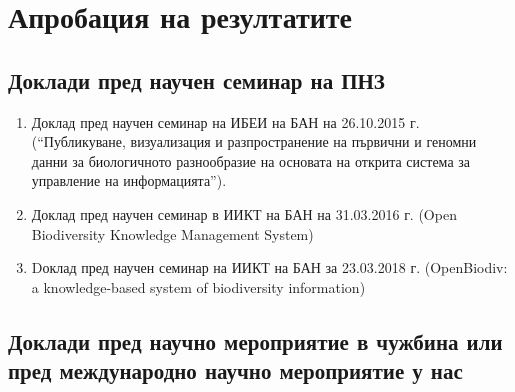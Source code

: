 \section*{Апробация на резултатите}

\subsection*{Доклади пред научен семинар на ПНЗ}

\begin{enumerate}
    \item Доклад пред научен семинар на ИБЕИ на БАН на 26.10.2015 г. (“Публикуване, визуализация и разпространение на първични и геномни данни за биологичното разнообразие на основата на открита система за управление на информацията”).
    \item Доклад пред научен семинар в ИИКТ на БАН на 31.03.2016 г. (Open Biodiversity Knowledge Management System)
    \item Dоклад пред научен семинар на ИИКТ на БАН за 23.03.2018 г. (OpenBiodiv: a knowledge-based system of biodiversity information)
\end{enumerate}

\subsection*{Доклади пред научно мероприятие в чужбина или пред международно научно мероприятие у нас}

